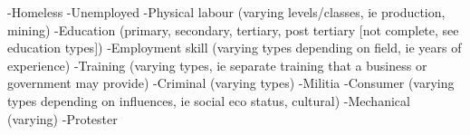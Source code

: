 -Homeless
-Unemployed
-Physical labour (varying levels/classes, ie production, mining)
-Education (primary, secondary, tertiary, post tertiary [not complete, see education types])
-Employment skill (varying types depending on field, ie years of experience)
-Training (varying types, ie separate training that a business or government may provide)
-Criminal (varying types)
-Militia
-Consumer (varying types depending on influences, ie social eco status, cultural)
-Mechanical (varying) 
-Protester





